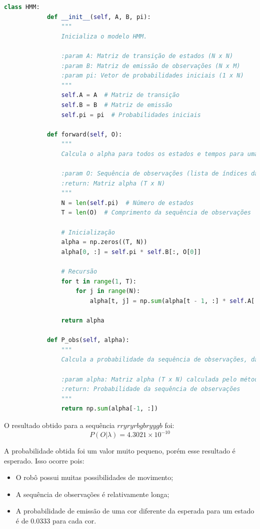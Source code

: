 \begin{itemize}
    \begin{lstlisting}[language=Python, caption=Classe HMM, label={lst:hmm}]
        class HMM:
            def __init__(self, A, B, pi):
                """
                Inicializa o modelo HMM.
                
                :param A: Matriz de transição de estados (N x N)
                :param B: Matriz de emissão de observações (N x M)
                :param pi: Vetor de probabilidades iniciais (1 x N)
                """
                self.A = A  # Matriz de transição
                self.B = B  # Matriz de emissão
                self.pi = pi  # Probabilidades iniciais

            def forward(self, O):
                """
                Calcula o alpha para todos os estados e tempos para uma sequência O.

                :param O: Sequência de observações (lista de índices das observações)
                :return: Matriz alpha (T x N)
                """
                N = len(self.pi)  # Número de estados
                T = len(O)  # Comprimento da sequência de observações

                # Inicialização
                alpha = np.zeros((T, N))
                alpha[0, :] = self.pi * self.B[:, O[0]]

                # Recursão
                for t in range(1, T):
                    for j in range(N):
                        alpha[t, j] = np.sum(alpha[t - 1, :] * self.A[:, j]) * self.B[j, O[t]]

                return alpha

            def P_obs(self, alpha):
                """
                Calcula a probabilidade da sequência de observações, dado o modelo.
                
                :param alpha: Matriz alpha (T x N) calculada pelo método forward
                :return: Probabilidade da sequência de observações
                """
                return np.sum(alpha[-1, :])
    \end{lstlisting}

    \begin{tcolorbox}[title=Resposta (continuação):]
        O resultado obtido para a sequência \( r r y r y r b g b r y y g b \) foi:
        \begin{equation}
            P(O |  \lambda) = 4.3021 \times 10^{-10}
        \end{equation}

        A probabilidade obtida foi um valor muito pequeno, porém esse resultado é esperado. Isso ocorre pois:
        \begin{itemize}
            \item O robô possui muitas possibilidades de movimento;
            \item A sequência de observações é relativamente longa;
            \item A probabilidade de emissão de uma cor diferente da esperada para um estado é de $0.0333$ para cada cor.
        \end{itemize}
        

\end{tcolorbox}
\end{itemize}
